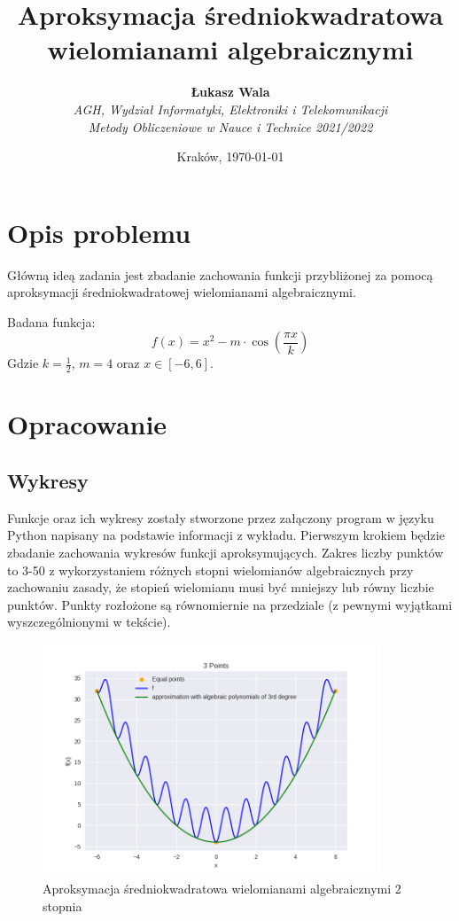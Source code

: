 \documentclass{article}
\title{Aproksymacja średniokwadratowa wielomianami algebraicznymi}
\author{\textbf{Łukasz Wala}\\
    \textit{AGH, Wydział Informatyki, Elektroniki i Telekomunikacji} \\
    \textit{Metody Obliczeniowe w Nauce i Technice 2021/2022}}
\date{Kraków, \today}
\begin{document}
\maketitle

\section{Opis problemu}
Główną ideą zadania jest zbadanie zachowania funkcji przybliżonej za pomocą aproksymacji
średniokwadratowej wielomianami algebraicznymi.

Badana funkcja:
\[f(x)=x^2-m\cdot\cos\left(\frac{\pi x}{k}\right)\]
Gdzie $k=\frac{1}{2}$, $m=4$ oraz $x\in [-6,6]$.

\section{Opracowanie}
\subsection{Wykresy}
Funkcje oraz ich wykresy zostały stworzone przez załączony program w języku Python napisany na podstawie informacji z wykładu. 
Pierwszym krokiem będzie zbadanie zachowania wykresów funkcji aproksymujących. Zakres liczby punktów to 3-50 z wykorzystaniem
różnych stopni wielomianów algebraicznych przy zachowaniu zasady, że stopień wielomianu musi być mniejszy lub równy liczbie punktów.
Punkty rozłożone są równomiernie na przedziale (z pewnymi wyjątkami wyszczególnionymi w tekście).

\begin{figure}[H]
    \centering
    \includegraphics[width=0.9\textwidth]{img/algpoly_2_3.png}
    \caption{Aproksymacja średniokwadratowa wielomianami algebraicznymi 2 stopnia}
\end{figure}
\end{document}
